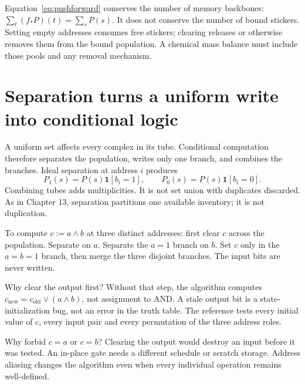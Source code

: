 Equation~\ref{eq:pushforward} conserves the number of memory backbones:
$\sum_t(f_*P)(t)=\sum_sP(s)$. It does not conserve the number of bound
stickers. Setting empty addresses consumes free stickers; clearing releases
or otherwise removes them from the bound population. A chemical mass
balance must include those pools and any removal mechanism.

\section{Separation turns a uniform write into conditional logic}
A uniform set affects every complex in its tube. Conditional computation
therefore separates the population, writes only one branch, and combines
the branches. Ideal separation at address $i$ produces
\begin{equation}
 P_1(s)=P(s)\mathbf1[b_i=1],\qquad
 P_0(s)=P(s)\mathbf1[b_i=0].
\end{equation}
Combining tubes adds multiplicities. It is not set union with duplicates
discarded. As in Chapter 13, separation partitions one available inventory;
it is not duplication.


To compute $c:=a\land b$ at three distinct addresses:
first clear $c$ across the population. Separate on $a$.
Separate the $a=1$ branch on $b$.
Set $c$ only in the $a=b=1$ branch, then merge the three disjoint branches.
The input bits are never written.


\begin{center}\end{center}

Why clear the output first? Without that step, the algorithm computes
$c_{\mathrm{new}}=c_{\mathrm{old}}\lor(a\land b)$, not assignment to AND.
A stale output bit is a state-initialization bug, not an error in the truth
table. The reference tests every initial value of $c$, every input pair
and every permutation of the three address roles.

Why forbid $c=a$ or $c=b$? Clearing the output would destroy an input
before it was tested. An in-place gate needs a different schedule or
scratch storage. Address aliasing changes the algorithm even when every
individual operation remains well-defined.

